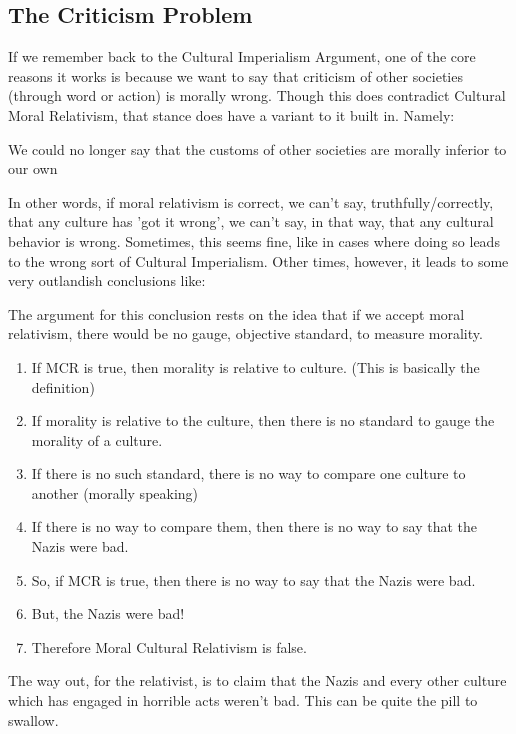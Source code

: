 \subsection{The Criticism Problem}

If we remember back to the Cultural Imperialism Argument, one of the core reasons it works is because we want to say that criticism of other societies (through word or action) is morally wrong. Though this does contradict Cultural Moral Relativism, that stance does have a variant to it built in. Namely:
\begin{center}
We could no longer say that the customs of other societies are morally inferior to our own
\end{center}
In other words, if moral relativism is correct, we can't say, truthfully/correctly, that any culture has 'got it wrong', we can't say, in that way, that any cultural behavior is wrong. Sometimes, this seems fine, like in cases where doing so leads to the wrong sort of Cultural Imperialism. Other times, however, it leads to some very outlandish conclusions like:

The argument for this conclusion rests on the idea that if we accept moral relativism, there would be no gauge, objective standard, to measure morality.
\begin{enumerate}
    \item If MCR is true, then morality is relative to culture. (This is basically the definition)
    \item If morality is relative to the culture, then there is no standard to gauge the morality of a culture.
    \item If there is no such standard, there is no way to compare one culture to another (morally speaking)
    \item If there is no way to compare them, then there is no way to say that the Nazis were bad.
    \item So, if MCR is true, then there is no way to say that the Nazis were bad.
    \item But, the Nazis were bad!
    \item Therefore Moral Cultural Relativism is false.
\end{enumerate}
The way out, for the relativist, is to claim that the Nazis and every other culture which has engaged in horrible acts weren't bad. This can be quite the pill to swallow. 

